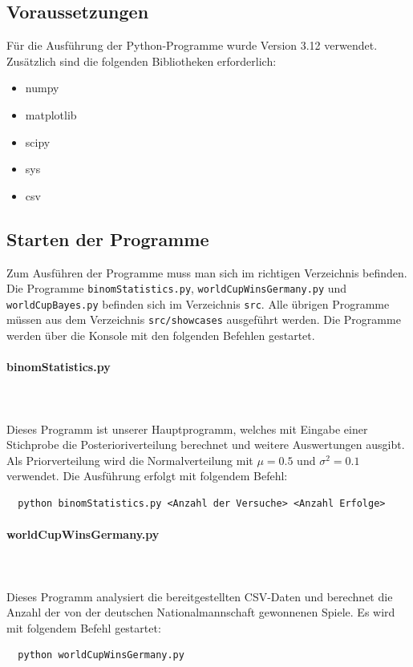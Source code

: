 \documentclass[a4paper,12pt]{article}
\begin{document}
\subsection{Voraussetzungen}
Für die Ausführung der Python-Programme wurde Version 3.12 verwendet. Zusätzlich sind die folgenden Bibliotheken erforderlich:
\begin{itemize}
  \item numpy
  \item matplotlib
  \item scipy
  \item sys
  \item csv
\end{itemize}

\subsection{Starten der Programme}
Zum Ausführen der Programme muss man sich im richtigen Verzeichnis befinden. Die Programme \texttt{binomStatistics.py}, \texttt{worldCupWinsGermany.py} und \texttt{worldCupBayes.py} befinden sich im Verzeichnis \texttt{src}. Alle übrigen Programme müssen aus dem Verzeichnis \texttt{src/showcases} ausgeführt werden. Die Programme werden über die Konsole mit den folgenden Befehlen gestartet.

\paragraph{binomStatistics.py} \mbox{}\\\\
Dieses Programm ist unserer Hauptprogramm, welches mit Eingabe einer Stichprobe die Posterioriverteilung berechnet und weitere Auswertungen ausgibt. Als Priorverteilung wird die Normalverteilung mit $\mu = 0.5$ und $\sigma^2 = 0.1$ verwendet. Die Ausführung erfolgt mit folgendem Befehl:
\begin{lstlisting}
  python binomStatistics.py <Anzahl der Versuche> <Anzahl Erfolge>
\end{lstlisting}

\paragraph{worldCupWinsGermany.py} \mbox{}\\\\
Dieses Programm analysiert die bereitgestellten CSV-Daten und berechnet die Anzahl der von der deutschen Nationalmannschaft gewonnenen Spiele. Es wird mit folgendem Befehl gestartet:
\begin{lstlisting}
  python worldCupWinsGermany.py
\end{lstlisting}
\end{document}
